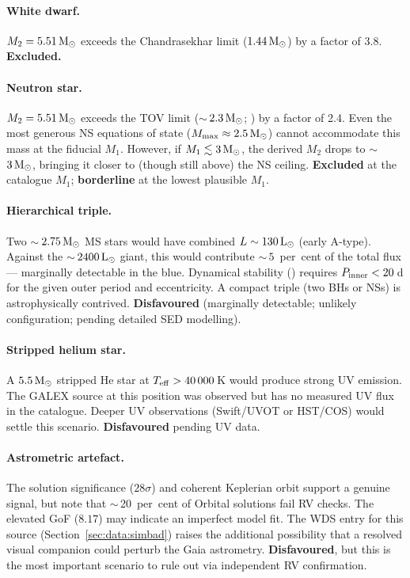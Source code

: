 \documentclass[usenatbib,fleqn]{mnras}
\newcommand{\Msun}{{\rm M}_\odot}
\newcommand{\Lsun}{{\rm L}_\odot}
\begin{document}
\paragraph{White dwarf.}
$M_2 = 5.51\,\Msun$ exceeds the Chandrasekhar limit
($1.44\,\Msun$) by a factor of 3.8.  \textbf{Excluded.}

\paragraph{Neutron star.}
$M_2 = 5.51\,\Msun$ exceeds the TOV limit ($\sim$\,$2.3\,\Msun$;
\citealt{Rezzolla2018}) by a factor of 2.4.  Even the most
generous NS equations of state ($M_{\rm max} \approx 2.5\,\Msun$)
cannot accommodate this mass at the fiducial $M_1$.  However, if
$M_1 \lesssim 3\,\Msun$, the derived $M_2$ drops to
$\sim$\,$3\,\Msun$, bringing it closer to (though still above)
the NS ceiling.  \textbf{Excluded} at the catalogue $M_1$;
\textbf{borderline} at the lowest plausible $M_1$.

\paragraph{Hierarchical triple.}
Two $\sim$\,$2.75\,\Msun$ MS stars would have combined
$L \sim 130\,\Lsun$ (early A-type).  Against the $\sim$\,$2400\,\Lsun$
giant, this would contribute $\sim$\,$5$~per~cent of the total
flux --- marginally detectable in the blue.
Dynamical stability (\citealt{MardlingAarseth2001}) requires
$P_{\rm inner} < 20$\,d for the given outer period and eccentricity.
A compact triple (two BHs or NSs) is astrophysically contrived.
\textbf{Disfavoured} (marginally detectable; unlikely configuration;
pending detailed SED modelling).

\paragraph{Stripped helium star.}
A $5.5\,\Msun$ stripped He star at $T_{\rm eff} > 40\,000$\,K
would produce strong UV emission.  The GALEX source at this
position was observed but has no measured UV flux in the
catalogue.  Deeper UV observations
(Swift/UVOT or HST/COS) would settle this scenario.
\textbf{Disfavoured} pending UV data.

\paragraph{Astrometric artefact.}
The solution significance ($28\sigma$) and coherent Keplerian orbit
support a genuine signal, but \citet{ElBadry2024} note that
$\sim$\,20~per~cent of Orbital solutions fail RV checks.
The elevated GoF ($8.17$) may indicate an imperfect model fit.
The WDS entry for this source (Section~\ref{sec:data:simbad})
raises the additional possibility that a resolved visual companion
could perturb the Gaia astrometry.
\textbf{Disfavoured}, but this is the most important scenario to
rule out via independent RV confirmation.
\end{document}
